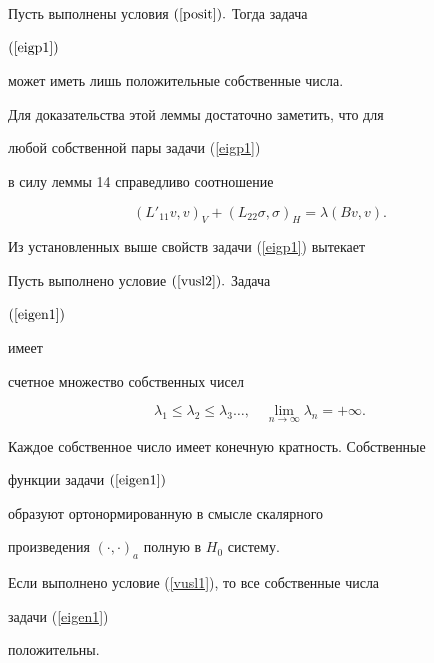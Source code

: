 \begin{lem}


Пусть выполнены условия $(\ref{posit}).$ Тогда задача 


$(\ref{eigp1})$


мо\-жет иметь лишь положительные собственные числа.


\end{lem} 





Для доказательства этой леммы достаточно заметить, что для 


любой собственной пары задачи (\ref{eigp1}) 


в силу леммы 14 справедливо соотношение


$$


(L'_{11}v, v)_V + (L_{22} \sigma, \sigma )_H = \lambda (Bv,v).


$$





Из установленных выше свойств задачи (\ref{eigp1}) вытекает





\begin{thm}


Пусть выполнено условие $(\ref{vusl2}).$ Задача 


$(\ref{eigen1})$


имеет 


счетное множество собственных чисел 


$$ 


\lambda_1 \le  \lambda_2 \le \lambda_3 \dots ,\quad


\lim \limits_{n \to \infty} \lambda_n = + \infty.


$$


Каждое собс\-твен\-ное число имеет конечную кратность. Собствен\-ные 


функции задачи $(\ref{eigen1})$


образуют ортонормированную в смысле скалярного 


произведения $ (\cdot,\cdot )_a $ полную в $H_0$ систему.


\end{thm} 


\begin{note}


Если выполнено условие (\ref{vusl1}), то все собственные числа


задачи (\ref{eigen1}) 


положительны.


\end{note} 





